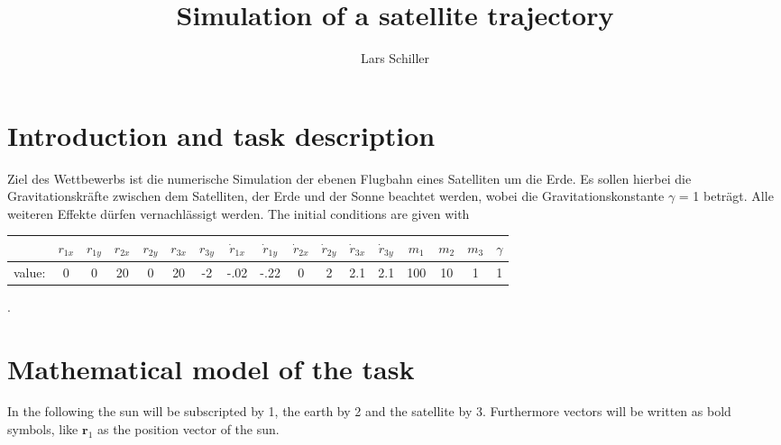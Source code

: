 \documentclass[11pt,a4paper,oneside]{scrartcl}
\author{Lars Schiller}
\title{Simulation of a satellite trajectory}
\begin{document}
\maketitle
\tableofcontents

\section{Introduction and task description}

Ziel des Wettbewerbs ist die numerische Simulation der ebenen Flugbahn eines Satelliten
um die Erde. Es sollen hierbei die Gravitationskräfte zwischen dem Satelliten, der Erde
und der Sonne beachtet werden, wobei die Gravitationskonstante 
$\gamma$ = 1 beträgt. Alle
weiteren Effekte dürfen vernachlässigt werden. The initial conditions are given with

\begin{tabular}{c|*{12}c|*{3}c|c}
&$r_{1x}$ & $r_{1y}$ & $r_{2x}$ & $r_{2y}$ & $r_{3x}$ & $r_{3y}$ & $\dot{r}_{1x}$ & $\dot{r}_{1y}$ & $\dot{r}_{2x}$ & $\dot{r}_{2y}$ & $\dot{r}_{3x}$ & $\dot{r}_{3y}$ &$m_1$&$m_2$&$m_3$ & $\gamma$\\ \hline
value: &  0 & 0 & 20 & 0 & 20 & -2 & -.02 & -.22 & 0 & 2 & 2.1 & 2.1 & 100 & 10 & 1 & 1 \\
\end{tabular}.



\section{Mathematical model of the task}
In the following the sun will be subscripted by 1, the earth by 2 and the satellite by 3. Furthermore vectors will be written as bold symbols, like $\boldsymbol{r}_1$ as the position vector of the sun.
\end{document}
